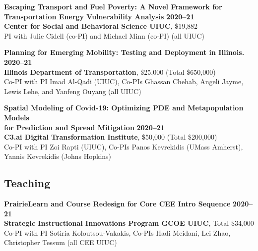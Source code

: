 \documentclass[margin,line]{resume}
\begin{document}
\begin{resume}
 \textbf{Escaping Transport and Fuel Poverty: A Novel Framework for Transportation Energy Vulnerability Analysis}  \hfill \textbf{2020--21}\vspace{-0mm}\\\vspace{-0mm}%
 {\bf Center for Social and Behavioral Science UIUC}, \$19,882 \\
 PI with Julie Cidell (co-PI) and Michael Minn (co-PI) (all UIUC)

 \textbf{Planning for Emerging Mobility: Testing and Deployment in Illinois.}  \hfill \textbf{2020--21}\vspace{-0mm}\\\vspace{-0mm}%
 {\bf Illinois Department of Transportation}, \$25,000 (Total \$650,000) \\
 Co-PI with PI Imad Al-Qadi (UIUC), Co-PIs Ghassan Chehab, Angeli Jayme, Lewis Lehe, and Yanfeng Ouyang (all UIUC)

 \textbf{Spatial Modeling of Covid-19: Optimizing PDE and Metapopulation Models\\ for Prediction and Spread Mitigation}  \hfill \textbf{2020--21}\vspace{-0mm}\\\vspace{-0mm}%
 {\bf C3.ai Digital Transformation Institute}, \$50,000 (Total \$200,000) \\
 Co-PI with PI Zoi Rapti (UIUC), Co-PIs Panos Kevrekidis (UMass Amherst), Yannis Kevrekidis (Johns Hopkins)
    \vspace{-0.2in}
    \subsection{\mysidestyle \bf Teaching}
       \vspace{-0.2in}
     \textbf{PrairieLearn and Course Redesign for Core CEE Intro Sequence}  \hfill \textbf{2020--21}\vspace{-0mm}\\\vspace{-0mm}%
 {\bf Strategic Instructional Innovations Program GCOE UIUC}, Total \$34,000 \\
 Co-PI with PI Sotiria Koloutsou-Vakakis, Co-PIs Hadi Meidani, Lei Zhao, Christopher Tessum (all CEE UIUC)


\end{resume}
\end{document}
